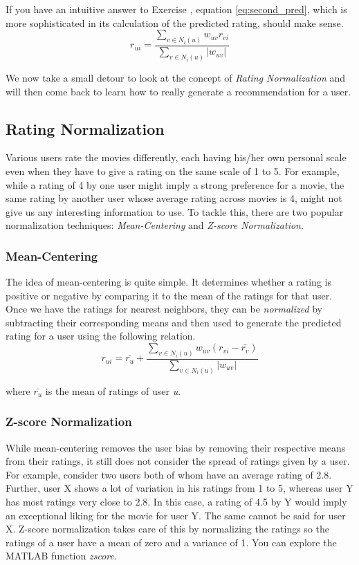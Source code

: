 If you have an intuitive answer to Exercise , equation  \ref{eq:second_pred}, which is more sophisticated in its calculation of the predicted rating, should make sense.
\begin{equation} \label{eq:second_pred}
r_{ui} = \frac
{\sum_{v \in{N_{i}(u)}}^{}{w_{uv}r_{vi}}}
{\sum_{v \in{N_{i}(u)}}^{}{|w_{uv}|}}
\end{equation}

We now take a small detour to look at the concept of \textit{Rating Normalization} and will then come back to learn how to really generate a recommendation for a user.

\subsection{Rating Normalization}
Various users rate the movies differently, each having his/her own personal scale even when they have to give a rating on the same scale of 1 to 5. For example, while a rating of 4 by one user might imply a strong preference for a movie, the same rating by another user whose average rating across movies is 4, might not give us any interesting information to use. To tackle this, there are two popular normalization techniques: \textit{Mean-Centering} and \textit{Z-score Normalization}.

\subsubsection{Mean-Centering}
The idea of mean-centering is quite simple. It determines whether a rating is positive or negative by comparing it to the mean of the ratings for that user. Once we have the ratings for nearest neighbors, they can be \textit{normalized} by subtracting their corresponding means and then used to generate the predicted rating for a user using the following relation.
\begin{equation}
r_{ui} = \bar{r_{u}} + \frac
{\sum_{v \in{N_{i}(u)}}^{}{w_{uv}(r_{vi} - \bar{r_{v}})}}
{\sum_{v \in{N_{i}(u)}}^{}{|w_{uv}|}}
\end{equation}

where $\bar{r_{u}}$ is the mean of ratings of user \textit{u}.

\subsubsection{Z-score Normalization}
 While mean-centering removes the user bias by removing their respective means from their ratings, it still does not consider the spread of ratings given by a user. For example, consider two users both of whom have an average rating of 2.8. Further, user X shows a lot of variation in his ratings from 1 to 5, whereas user Y has most ratings very close to 2.8. In this case, a rating of 4.5 by Y would imply an exceptional liking for the movie for user Y. The same cannot be said for user X. Z-score normalization takes care of this by normalizing the ratings so the ratings of a user have a mean of zero and a variance of 1. You can explore the MATLAB function \textit{zscore}.
 
